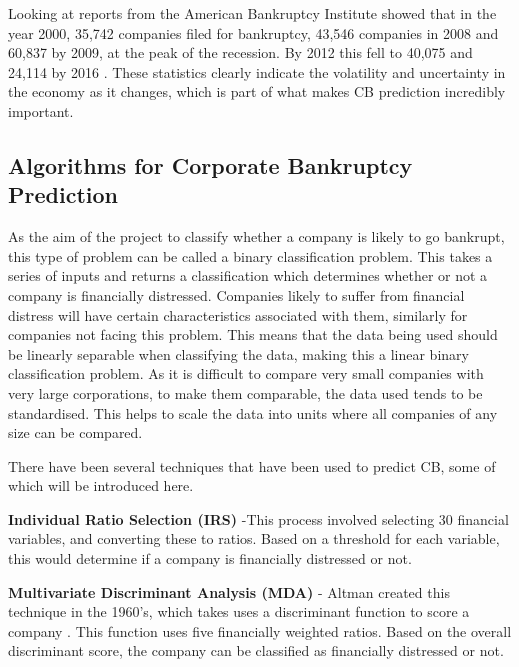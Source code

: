 \documentclass[11pt]{article}
\begin{document}
Looking at reports from the American Bankruptcy Institute \cite{?} showed that in the year 2000, 35,742 companies filed for bankruptcy, 43,546 companies in 2008 and 60,837 by 2009, at the peak of the recession. By 2012 this fell to 40,075 and 24,114 by 2016 . These statistics clearly indicate the volatility and uncertainty in the economy as it changes, which is part of what makes CB prediction incredibly important.
\subsection{Algorithms for Corporate Bankruptcy Prediction}
As the aim of the project to classify whether a company is likely to go bankrupt, this type of problem can be called a binary classification problem. This takes a series of inputs and returns a classification which determines whether or not a company is financially distressed. Companies likely to suffer from financial distress will have certain characteristics associated with them, similarly for companies not facing this problem. This means that the data being used should be linearly separable when classifying the data, making this a linear binary classification problem. As it is difficult to compare very small companies with very large corporations, to make them comparable, the data used tends to be standardised. This helps to scale the data into units where all companies of any size can be compared. 

 There have been several techniques that have been used to predict CB, some of which will be introduced here.  

\textbf{Individual Ratio Selection (IRS)} -This process involved selecting 30 financial variables, and converting these to ratios. Based on a threshold for each variable, this would determine if a company is financially distressed or not.

\textbf{Multivariate Discriminant Analysis (MDA)} - Altman created this technique in the 1960's, which takes uses a discriminant function to score a company \cite{?}. This function uses five financially weighted ratios. Based on the overall discriminant score, the company can be classified as financially distressed or not.
\end{document}
